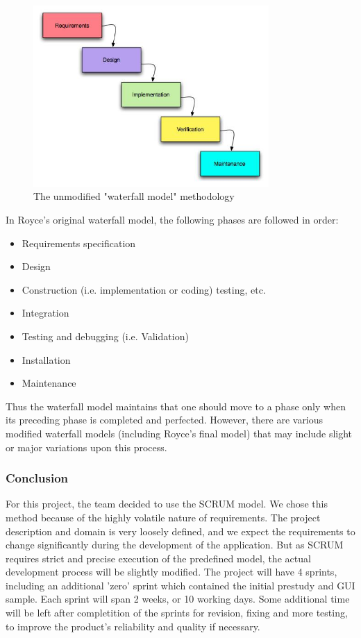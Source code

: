 \begin{figure}[htb]
	\centering
	\includegraphics[width=0.8\textwidth]{process/development_process/waterfall.jpg}
	\caption{The unmodified "waterfall model" methodology\cite{worldpress:waterfall}}
	\label{fig:waterfall-model}
\end{figure}

In Royce's original waterfall model, the following phases are followed in order:

\begin{itemize}
	\item Requirements specification
	\item Design
	\item Construction (i.e. implementation or coding) testing, etc.
	\item Integration
	\item Testing and debugging (i.e. Validation)
	\item Installation
	\item Maintenance
\end{itemize}

Thus the waterfall model maintains that one should move to a phase only when its preceding phase is 
completed and perfected. However, there are various modified waterfall models (including Royce's final model) 
that may include slight or major variations upon this process.

\subsubsection{Conclusion}
For this project, the team decided to use the SCRUM model. We chose this method because of the highly volatile nature
of requirements. The project description and domain is very loosely defined,
and we expect the requirements to change significantly during the development
of the application. But as SCRUM requires strict and precise
execution of the predefined model, the actual development process will be slightly modified.  
The project will have 4 sprints, including an additional 'zero' sprint which contained the initial
prestudy and GUI sample. Each sprint will span 2 weeks, or 10 working days. 
Some additional time will be left after completition of the sprints for revision, 
fixing and more testing, to improve the product's reliability and quality if necessary.

